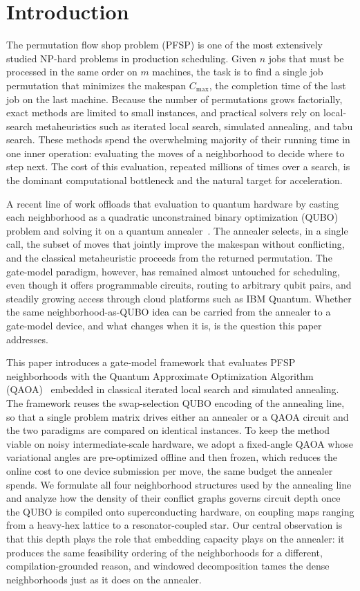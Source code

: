\documentclass{svproc}
\begin{document}
\section{Introduction}
\label{sec:intro}
The permutation flow shop problem (PFSP) is one of the most extensively
studied NP-hard problems in production scheduling. Given $n$ jobs that
must be processed in the same order on $m$ machines, the task is to find
a single job permutation that minimizes the makespan $C_{\max}$, the
completion time of the last job on the last machine. Because the number
of permutations grows factorially, exact methods are limited to small
instances, and practical solvers rely on local-search metaheuristics
such as iterated local search, simulated annealing, and tabu search.
These methods spend the overwhelming majority of their running time in
one inner operation: evaluating the moves of a neighborhood to decide
where to step next. The cost of this evaluation, repeated millions of
times over a search, is the dominant computational bottleneck and the
natural target for acceleration.

A recent line of work offloads that evaluation to quantum hardware by
casting each neighborhood as a quadratic unconstrained binary
optimization (QUBO) problem and solving it on a quantum
annealer~\cite{wojewodzki2026bpasts,wojewodzki2026windowed}. The
annealer selects, in a single call, the subset of moves that jointly
improve the makespan without conflicting, and the classical
metaheuristic proceeds from the returned permutation. The gate-model
paradigm, however, has remained almost untouched for scheduling, even
though it offers programmable circuits, routing to arbitrary qubit
pairs, and steadily growing access through cloud platforms such as IBM
Quantum. Whether the same neighborhood-as-QUBO idea can be carried from
the annealer to a gate-model device, and what changes when it is, is the
question this paper addresses.

This paper introduces a gate-model framework that evaluates PFSP
neighborhoods with the Quantum Approximate Optimization Algorithm
(QAOA)~\cite{farhi2014qaoa} embedded in classical iterated local search
and simulated annealing. The framework reuses the swap-selection QUBO
encoding of the annealing line, so that a single problem matrix drives
either an annealer or a QAOA circuit and the two paradigms are compared
on identical instances. To keep the method viable on noisy
intermediate-scale hardware, we adopt a fixed-angle QAOA whose
variational angles are pre-optimized offline and then frozen, which reduces
the online cost to one device submission per move, the same budget the
annealer spends. We formulate all four neighborhood structures used by
the annealing line and analyze how the density of their conflict graphs
governs circuit depth once the QUBO is compiled onto superconducting
hardware, on coupling maps ranging from a heavy-hex lattice to a
resonator-coupled star. Our central observation is that this depth
plays the role that embedding capacity plays on the annealer: it
produces the same feasibility ordering of the neighborhoods for a
different, compilation-grounded reason, and windowed decomposition tames
the dense neighborhoods just as it does on the annealer.
\end{document}
